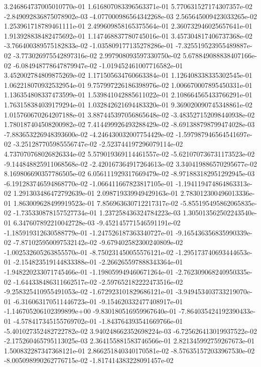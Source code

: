 3.246864737005010770e-01
1.616807083396563371e-01
5.770631527174307357e-02
-2.849092836875078902e-03
-4.077000986564342268e-03
2.565645009423033265e-02
1.253961718789461111e-01
2.499609858165375564e-01
2.360732946025657641e-01
1.913928838482475692e-01
1.147468837780745016e-01
3.457304817406737368e-02
-3.766400389575182833e-02
-1.035809177135278286e-01
-7.325519523955489887e-02
-3.773026975542897316e-02
2.997908093597330750e-02
5.678849088838407166e-02
-6.084948778647879947e-02
-1.019452461007716582e-01
3.452002784809875269e-02
1.171505634760663384e-01
1.126408338335302545e-01
1.062218070932532954e-01
9.757997226186398976e-02
1.006670007895450331e-01
1.136354808337473599e-01
1.539841042885611022e-01
2.108664565433766291e-01
1.763158384039179294e-01
1.032842621694483320e-01
9.369020090745348861e-02
1.015760670264207188e-01
3.887445397056865648e-02
-3.483527152098440938e-02
1.780187404508200982e-02
7.414499926493288429e-02
-8.691388798799474028e-03
-7.883653226948393600e-02
-4.246430032007754429e-02
-1.597987946564541697e-02
-3.251287705985556747e-02
-2.523744197296079114e-02
4.737070768026826334e-02
5.579019369114461557e-02
-5.621070736731173523e-02
-9.144848825911068568e-02
-2.420167364917264613e-02
3.340419886570295677e-02
8.169806690357786505e-02
6.056111929317669479e-02
-8.971883182951292945e-03
-6.191283746594868770e-02
-1.066411667823817105e-01
-1.194119474864863313e-02
1.291303486472792639e-01
2.098719339949429163e-01
2.783012300496013336e-01
1.863009628499919523e-01
7.856963630712217317e-02
-5.855195495862065835e-02
-1.735330878157527734e-01
1.237258436324784223e-03
1.305013562502243540e-01
6.347607892210042728e-03
-9.452145771546591191e-02
-1.185919312630588779e-01
-1.247526187363340727e-01
-9.165436356835990339e-02
-7.871025950097532142e-02
-9.679402582300240809e-02
-1.002532605263855570e-01
-8.750231450055576121e-02
-1.295173740693444653e-01
-2.154823519144833388e-01
-2.266265597888343364e-01
-1.948220233071745466e-01
-1.198059949460671264e-01
-2.762309068240950335e-02
-1.644338486311662517e-02
-2.597652182222473516e-02
-9.258325410955491053e-02
-1.672923101829686121e-01
-3.949453403733219070e-01
-6.316063170511446723e-01
-9.154620332477408917e-01
-1.146705206102399899e+00
-9.830180516959967640e-01
-7.864035424192390433e-01
-4.578417345155769702e-01
-1.843764393541669766e-01
-5.401027352482722782e-02
3.940248662352698224e-03
-6.725626413019937522e-02
-2.175260465795113025e-03
2.364155881583746566e-01
2.821345992759267673e-01
1.500832287347368121e-01
2.866251840340170581e-02
-8.576351572033967530e-02
-8.005098990262776715e-02
-1.817414383228091457e-02
